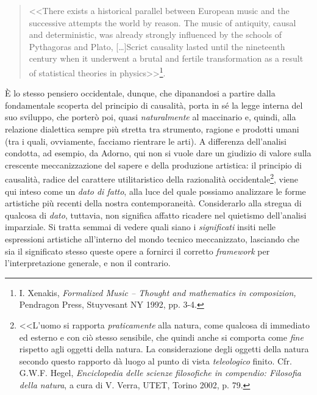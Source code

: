 \documentclass[a4paper,12pt]{scrartcl}
\newcommand{\omissis}{[\dots\unkern]}
\begin{document}
	\begin{quotation}
		\small{<<There exists a historical parallel between European music and the successive attempts the world by reason. The music of antiquity, causal and deterministic, was already strongly influenced by the schools of Pythagoras and Plato, \omissis Scrict causality lasted until the nineteenth century when it underwent a brutal and fertile transformation as a result of statistical theories in physics>>}\footnote{I. Xenakis, \textit{Formalized Music -- Thought and mathematics in composizion,} Pendragon Press, Stuyvesant NY 1992, pp. 3-4.}.
	\end{quotation}
	
	È lo stesso pensiero occidentale, dunque, che dipanandosi a partire dalla fondamentale scoperta del principio di causalità, porta in sé la legge interna del suo sviluppo, che porterò poi, quasi \emph{naturalmente} al maccinario e, quindi, alla relazione dialettica sempre più stretta tra strumento, ragione e prodotti umani (tra i quali, ovviamente, facciamo rientrare le arti). A differenza dell'analisi condotta, ad esempio, da Adorno, qui non si vuole dare un giudizio di valore sulla crescente meccanizzazione del sapere e della produzione artistica: il principio di causalità, radice del carattere utilitaristico della razionalità occidentale\footnote{<<L'uomo si rapporta \emph{praticamente} alla natura, come qualcosa di immediato ed esterno e con ciò stesso sensibile, che quindi anche si comporta come \emph{fine} rispetto agli oggetti della natura. La considerazione degli oggetti della natura secondo questo rapporto dà luogo al punto di vista \emph{teleologico} finito. Cfr. G.W.F. Hegel, \textit{Enciclopedia delle scienze filosofiche in compendio: Filosofia della natura}, a cura di V. Verra, UTET, Torino 2002, p. 79.}, 
	viene qui inteso come un \emph{dato di fatto}, alla luce del quale possiamo analizzare le forme artistiche più recenti della nostra contemporaneità. Considerarlo alla stregua di qualcosa di \emph{dato}, tuttavia, non significa affatto ricadere nel quietismo dell'analisi imparziale. Si tratta semmai di vedere quali siano i \emph{significati} insiti nelle espressioni artistiche all'interno del mondo tecnico meccanizzato, lasciando che sia il significato stesso queste opere a fornirci il corretto \emph{framework} per l'interpretazione generale, e non il contrario.
	
\end{document}
